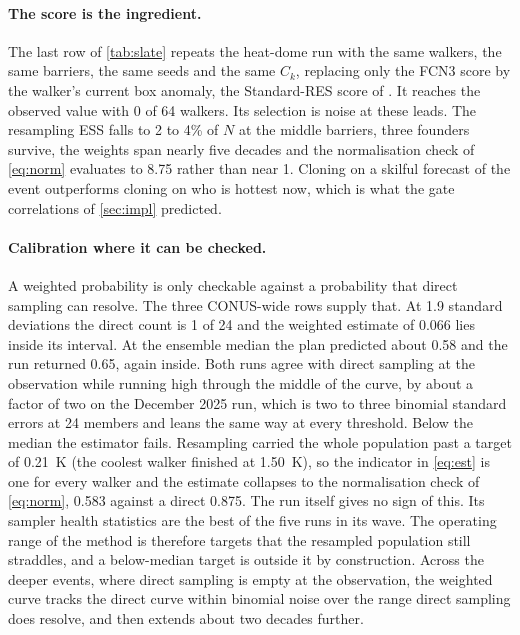 \documentclass[10pt,twocolumn]{article}
\newcommand{\ck}{C_k}
\begin{document}
\paragraph{The score is the ingredient.}
The last row of \cref{tab:slate} repeats the heat-dome run with the same walkers, the same barriers, the same seeds and the same $\ck$, replacing only the FCN3 score by the walker's current box anomaly, the Standard-RES score of \citet{lancelin2026airres}. It reaches the observed value with 0 of 64 walkers. Its selection is noise at these leads. The resampling ESS falls to 2 to 4\% of $N$ at the middle barriers, three founders survive, the weights span nearly five decades and the normalisation check of \cref{eq:norm} evaluates to 8.75 rather than near 1. Cloning on a skilful forecast of the event outperforms cloning on who is hottest now, which is what the gate correlations of \cref{sec:impl} predicted.

\paragraph{Calibration where it can be checked.}\label{par:calib}
A weighted probability is only checkable against a probability that direct sampling can resolve. The three CONUS-wide rows supply that. At 1.9 standard deviations the direct count is 1 of 24 and the weighted estimate of 0.066 lies inside its interval. At the ensemble median the plan predicted about 0.58 and the run returned 0.65, again inside. Both runs agree with direct sampling at the observation while running high through the middle of the curve, by about a factor of two on the December 2025 run, which is two to three binomial standard errors at 24 members and leans the same way at every threshold. Below the median the estimator fails. Resampling carried the whole population past a target of \SI{+0.21}{K} (the coolest walker finished at \SI{+1.50}{K}), so the indicator in \cref{eq:est} is one for every walker and the estimate collapses to the normalisation check of \cref{eq:norm}, 0.583 against a direct 0.875. The run itself gives no sign of this. Its sampler health statistics are the best of the five runs in its wave. The operating range of the method is therefore targets that the resampled population still straddles, and a below-median target is outside it by construction. Across the deeper events, where direct sampling is empty at the observation, the weighted curve tracks the direct curve within binomial noise over the range direct sampling does resolve, and then extends about two decades further.
\end{document}
